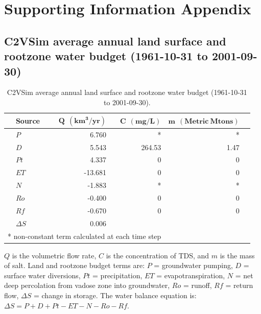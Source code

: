 \section{Supporting Information Appendix} \label{ap_b_abcsal}


\subsection{C2VSim average annual land surface and rootzone water budget (1961-10-31 to 2001-09-30)}


\bgroup

\renewcommand{\arraystretch}{1.5}

\setlength{\tabcolsep}{1.3em}

\centering
\begin{threeparttable}
	\begin{table}[H]
		\caption{C2VSim average annual land surface and rootzone water budget (1961-10-31 to 2001-09-30).}
		
		\begin{tabular}{rlrrrr}
			
			
			
			& \textbf{Source} & $\bm{Q \: \: (km^3/yr)}$ & $\bm{C \: \: (mg/L)}$ & $\bm{m \: \: (Metric \: Mtons)}$ & \\ 
			\hline
			& $P$ & 6.760 & * & * & \\ 
			& $D$ & 5.543 & 264.53 & 1.47 & \\ 
			& $Pt$ & 4.337 & 0 & 0 & \\ 
			& $ET$ & -13.681 & 0 & 0 & \\ 
			& $N$ & -1.883 & * & * & \\ 
			& $Ro$ & -0.400 & 0 & 0 & \\
			& $Rf$ & -0.670 & 0 & 0 & \\
			& $\Delta S$ & 0.006 &  &  & \\ 
			\hline
			\multicolumn{4}{l}{\scriptsize{* non-constant term calculated at each time step}} 
		\end{tabular}
		
		$Q$ is the volumetric flow rate, $C$ is the concentration of TDS, and $m$ is the mass of salt. Land and rootzone budget terms are: 
		$P$ = groundwater pumping, 
		$D$ = surface water diversions,
		$Pt$ = precipitation,
		$ET$ = evapotranspiration,
		$N$ = net deep percolation from vadose zone into groundwater,
		$Ro$ = runoff,
		$Rf$ = return flow,
		$\Delta S$ = change in storage. 
		The water balance equation is: $\Delta S = P + D + Pt - ET - N - Ro - Rf$.  
		
		\label{ap_b_lsb}
	\end{table}
	
\end{threeparttable}


